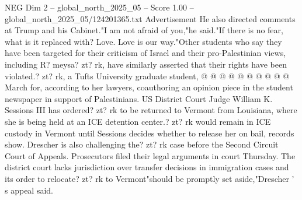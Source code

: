 \begin{textsample}{NEG Dim 2 – global\_north\_2025\_05 – Score 1.00 – global\_north\_2025\_05/124201365.txt}
Advertisement He also directed comments at Trump and his Cabinet."I am not afraid of you,"he said."If there is no fear, what is it replaced with?
Love.
Love is our way."Other students who say they have been targeted for their criticism of Israel and their pro-Palestinian views, including R? meysa? zt? rk, have similarly asserted that their rights have been violated.? zt? rk, a Tufts University graduate student, @ @ @ @ @ @ @ @ @ @ March for, according to her lawyers, coauthoring an opinion piece in the student newspaper in support of Palestinians.
US District Court Judge William K.
Sessions III has ordered? zt? rk to be returned to Vermont from Louisiana, where she is being held at an ICE detention center.? zt? rk would remain in ICE custody in Vermont until Sessions decides whether to release her on bail, records show.
Drescher is also challenging the? zt? rk case before the Second Circuit Court of Appeals.
Prosecutors filed their legal arguments in court Thursday.
The district court lacks jurisdiction over transfer decisions in immigration cases and its order to relocate? zt? rk to Vermont"should be promptly set aside,"Drescher ' s appeal said.

\end{textsample}
